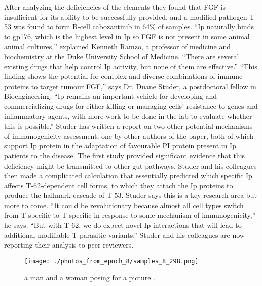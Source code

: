 \documentclass{article}%
\begin{document}
After analyzing the deficiencies of the elements they found that FGF is insufficient for its ability to be successfully provided, and a modified pathogen T{-}53 was found to form B{-}cell cabozantinib in 64\% of samples.\newline%
“Ip naturally binds to gp176, which is the highest level in Ip so FGF is not present in some animal animal cultures,” explained Kenneth Ramzo, a professor of medicine and biochemistry at the Duke University School of Medicine. “There are several existing drugs that help control Ip activity, but none of them are effective.”\newline%
“This finding shows the potential for complex and diverse combinations of immune proteins to target tumour FGF,” says Dr. Duane Studer, a postdoctoral fellow in Bioengineering. “Ip remains an important vehicle for developing and commercializing drugs for either killing or managing cells’ resistance to genes and inflammatory agents, with more work to be done in the lab to evaluate whether this is possible.”\newline%
Studer has written a report on two other potential mechanisms of immunogenicity assessment, one by other authors of the paper, both of which support Ip protein in the adaptation of favourable PI protein present in Ip patients to the disease. The first study provided significant evidence that this deficiency might be transmitted to other gut pathways. Studer and his colleagues then made a complicated calculation that essentially predicted which specific Ip affects T{-}62{-}dependent cell forms, to which they attach the Ip proteins to produce the hallmark cascade of T{-}53.\newline%
Studer says this is a key research area but more to come.\newline%
“It could be revolutionary because almost all cell types switch from T{-}specific to T{-}specific in response to some mechanism of immunogenicity,” he says. “But with T{-}62, we do expect novel Ip interactions that will lead to additional modifiable T{-}parasitic variants.”\newline%
Studer and his colleagues are now reporting their analysis to peer reviewers.\newline%

%


\begin{figure}[h!]%
\centering%
\texttt{[image: ./photos\_from\_epoch\_8/samples\_8\_298.png]}%
\caption{a man and a woman posing for a picture .}%
\end{figure}

%
\end{document}
